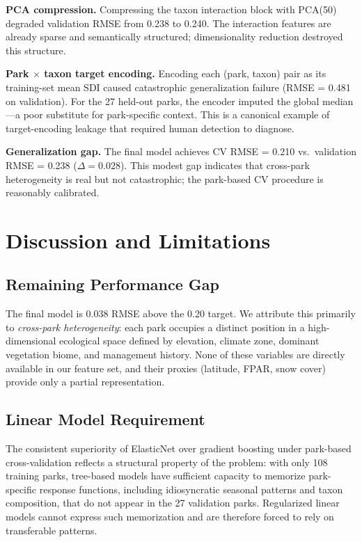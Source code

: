 \documentclass{article}
\begin{document}
\textbf{PCA compression.}
Compressing the taxon interaction block with PCA(50) degraded
validation RMSE from 0.238 to 0.240. The interaction features are
already sparse and semantically structured; dimensionality reduction
destroyed this structure.

\textbf{Park $\times$ taxon target encoding.}
Encoding each (park, taxon) pair as its training-set mean SDI caused
catastrophic generalization failure (RMSE = 0.481 on validation). For
the 27 held-out parks, the encoder imputed the global median---a poor
substitute for park-specific context. This is a canonical example of
target-encoding leakage that required human detection to diagnose.

\textbf{Generalization gap.}
The final model achieves CV RMSE = 0.210 vs.\ validation RMSE = 0.238
($\Delta = 0.028$). This modest gap indicates that cross-park
heterogeneity is real but not catastrophic; the park-based CV
procedure is reasonably calibrated.

\section{Discussion and Limitations}
\label{sec:discussion}

\subsection{Remaining Performance Gap}

The final model is 0.038 RMSE above the 0.20 target. We attribute this
primarily to \emph{cross-park heterogeneity}: each park occupies a
distinct position in a high-dimensional ecological space defined by
elevation, climate zone, dominant vegetation biome, and management
history. None of these variables are directly available in our feature
set, and their proxies (latitude, FPAR, snow cover) provide only a
partial representation.

\subsection{Linear Model Requirement}

The consistent superiority of ElasticNet over gradient boosting under
park-based cross-validation reflects a structural property of the
problem: with only 108 training parks, tree-based models have
sufficient capacity to memorize park-specific response functions,
including idiosyncratic seasonal patterns and taxon composition, that
do not appear in the 27 validation parks. Regularized linear models
cannot express such memorization and are therefore forced to rely on
transferable patterns.
\end{document}
